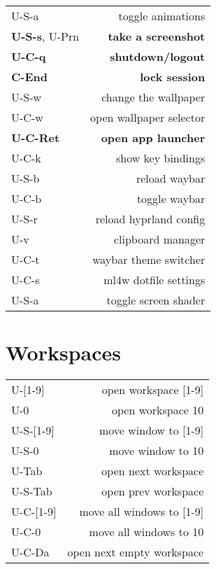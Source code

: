 \documentclass[
  ,landscape
  ,columns=4
]{cheatsheet}
\begin{document}
\begin{tabular}{lr}
  U-S-a & toggle animations \\
  \textbf{U-S-s}, U-Prn & \textbf{take a screenshot} \\
  \textbf{U-C-q} & \textbf{shutdown/logout} \\
  \textbf{C-End} & \textbf{lock session} \\
  U-S-w & change the wallpaper \\
  U-C-w & open wallpaper selector \\
  \textbf{U-C-Ret} & \textbf{open app launcher} \\
  U-C-k & show key bindings \\
  U-S-b & reload waybar \\
  U-C-b & toggle waybar \\
  U-S-r & reload hyprland config \\
  U-v & clipboard manager \\
  U-C-t & waybar theme switcher \\
  U-C-s & ml4w dotfile settings \\
  U-S-a & toggle screen shader \\

\end{tabular}

\section{Workspaces}

\begin{tabular}{lr}
  U-[1-9] & open workspace [1-9] \\
  U-0 & open workspace 10 \\
  U-S-[1-9] & move window to [1-9] \\
  U-S-0 & move window to 10 \\
  U-Tab & open next workspace \\
  U-S-Tab & open prev workspace \\
  U-C-[1-9] & move all windows to [1-9] \\
  U-C-0 & move all windows to 10 \\
  U-C-Da & open next empty workspace \\
\end{tabular}
\end{document}
